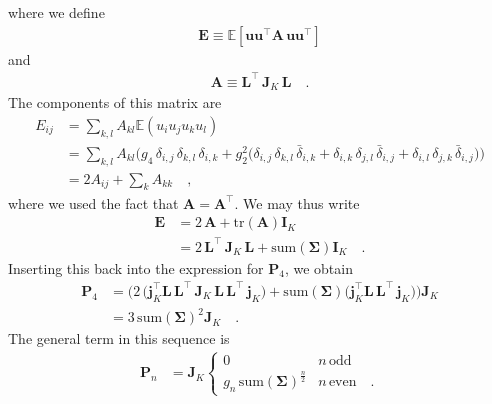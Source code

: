 \documentclass[modern]{aastex62}
\begin{document}
%
where we define
%
\begin{align}
    \mathbf{E} \equiv \mathbb{E}\left[ \mathbf{u} \mathbf{u}^\top  \mathbf{A} \,  \mathbf{u} \mathbf{u}^\top \right]
\end{align}
%
and
%
\begin{align}
    \mathbf{A} \equiv \mathbf{L}^\top \, \mathbf{J}_K \, \mathbf{L}
    \quad.
\end{align}
%
The components of this matrix are
%
\begin{align}
    E_{ij} & =
    \sum\limits_{k,l}A_{kl} \mathbb{E}(u_i u_j u_k u_l)
    \nonumber  \\
           & =
    \sum\limits_{k,l}A_{kl}
    \Big(
    g_4 \, \delta_{i, j} \, \delta_{k, l} \, \delta_{i, k}
    +
    g_2^2 \big(
        \delta_{i, j} \, \delta_{k, l} \, \bar{\delta}_{i, k}
        +
        \delta_{i, k} \, \delta_{j, l} \, \bar{\delta}_{i, j}
        +
        \delta_{i, l} \, \delta_{j, k} \, \bar{\delta}_{i, j}
        \big)
    \Big)
    \nonumber  \\
           & =
    2 A_{ij} + \sum\limits_k A_{kk}
    \quad,
\end{align}
%
where we used the fact that $\mathbf{A} = \mathbf{A}^\top$. We may thus write
%
\begin{align}
    \mathbf{E} & =
    2 \, \mathbf{A} + \mathrm{tr}(\mathbf{A}) \mathbf{I}_K
    \nonumber      \\
               & =
    2 \, \mathbf{L}^\top \, \mathbf{J}_K \, \mathbf{L} + \mathrm{sum}(\pmb{\Sigma}) \mathbf{I}_K
    \quad.
\end{align}
%
Inserting this back into the expression for $\mathbf{P}_4$, we obtain
%
\begin{align}
    \mathbf{P}_4 & =
    \bigg(
    2 \, \big(\mathbf{j}_K^\top \mathbf{L} \, \mathbf{L}^\top \, \mathbf{J}_K \, \mathbf{L} \, \mathbf{L}^\top \, \mathbf{j}_K \big)
    +
    \mathrm{sum}(\pmb{\Sigma}) \big(\mathbf{j}_K^\top \mathbf{L} \, \mathbf{L}^\top \, \mathbf{j}_K \big)
    \bigg) \mathbf{J}_K
    \nonumber        \\
                 & =
    3 \, \mathrm{sum}(\pmb{\Sigma})^2 \mathbf{J}_K
    \quad.
\end{align}
%
The general term in this sequence is
%
\begin{align}
    \mathbf{P}_n & =
    \mathbf{J}_K
    \begin{cases}
        0                                             & n \, \mathrm{odd}
        \\
        g_n \, \mathrm{sum}(\pmb{\Sigma})^\frac{n}{2} & n \, \mathrm{even}
        \quad.
    \end{cases}
\end{align}
%
\end{document}
